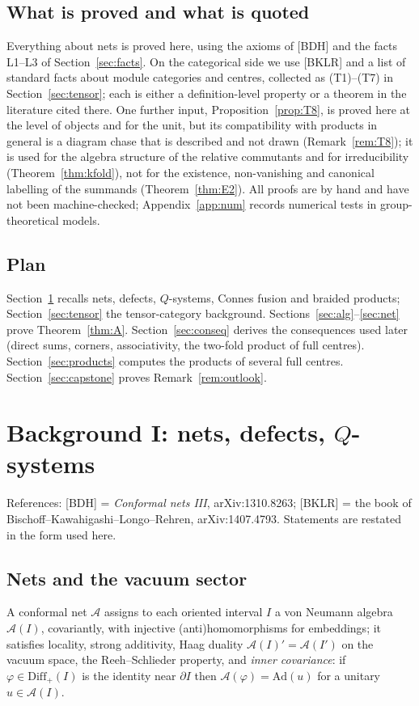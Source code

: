 \documentclass[11pt]{article}
\theoremstyle{definition}
\theoremstyle{remark}
\newcommand{\cA}{\mathcal A}
\begin{document}
\subsection{What is proved and what is quoted}
Everything about nets is proved here, using the axioms of [BDH] and the facts L1--L3 of Section~\ref{sec:facts}. On the categorical side we use [BKLR] and a list of standard facts about module categories and centres, collected as (T1)--(T7) in Section~\ref{sec:tensor}; each is either a definition-level property or a theorem in the literature cited there. One further input, Proposition~\ref{prop:T8}, is proved here at the level of objects and for the unit, but its compatibility with products in general is a diagram chase that is described and not drawn (Remark~\ref{rem:T8}); it is used for the algebra structure of the relative commutants and for irreducibility (Theorem~\ref{thm:kfold}), not for the existence, non-vanishing and canonical labelling of the summands (Theorem~\ref{thm:E2}). All proofs are by hand and have not been machine-checked; Appendix~\ref{app:num} records numerical tests in group-theoretical models.

\subsection{Plan}
Section~\ref{sec:prelim} recalls nets, defects, $Q$-systems, Connes fusion and braided products; Section~\ref{sec:tensor} the tensor-category background. Sections~\ref{sec:alg}--\ref{sec:net} prove Theorem~\ref{thm:A}. Section~\ref{sec:conseq} derives the consequences used later (direct sums, corners, associativity, the two-fold product of full centres). Section~\ref{sec:products} computes the products of several full centres. Section~\ref{sec:capstone} proves Remark~\ref{rem:outlook}.

\section{Background I: nets, defects, $Q$-systems}\label{sec:prelim}

References: [BDH] = \emph{Conformal nets III}, arXiv:1310.8263; [BKLR] = the book of Bischoff--Kawahigashi--Longo--Rehren, arXiv:1407.4793. Statements are restated in the form used here.

\subsection{Nets and the vacuum sector}\label{sec:nets}
A conformal net $\cA$ assigns to each oriented interval $I$ a von Neumann algebra $\cA(I)$, covariantly, with injective (anti)homomorphisms for embeddings; it satisfies locality, strong additivity, Haag duality $\cA(I)'=\cA(I')$ on the vacuum space, the Reeh--Schlieder property, and \emph{inner covariance}: if $\varphi\in\mathrm{Diff}_+(I)$ is the identity near $\partial I$ then $\cA(\varphi)=\mathrm{Ad}(u)$ for a unitary $u\in\cA(I)$.
\end{document}
